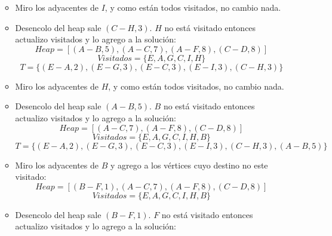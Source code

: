 \documentclass{article}
\begin{document}
\begin{enumerate}[label=\alph*)]
\begin{itemize}
\begin{equation*}
                \end{equation*}
            \item Miro los adyacentes de $I$, y como están todos visitados, no cambio nada.
            \item Desencolo del heap sale $(C-H, 3)$. $H$ no está visitado entonces actualizo visitados y lo agrego a la solución:
                \begin{equation*}
                    Heap = [(A-B, 5), (A-C, 7), (A-F, 8), (C-D, 8)]
                \end{equation*}
                \begin{equation*}
                    Visitados = \{E, A, G, C, I, H\}
                \end{equation*}
                \begin{equation*}
                    T = \{(E-A, 2), (E-G, 3), (E-C, 3), (E-I, 3), (C-H, 3)\}
                \end{equation*}
            \item Miro los adyacentes de $H$, y como están todos visitados, no cambio nada.
            \item Desencolo del heap sale $(A-B, 5)$. $B$ no está visitado entonces actualizo visitados y lo agrego a la solución:
                \begin{equation*}
                    Heap = [(A-C, 7), (A-F, 8), (C-D, 8)]
                \end{equation*}
                \begin{equation*}
                    Visitados = \{E, A, G, C, I, H, B\}
                \end{equation*}
                \begin{equation*}
                    T = \{(E-A, 2), (E-G, 3), (E-C, 3), (E-I, 3), (C-H, 3), (A-B, 5)\}
                \end{equation*}
            \item Miro los adyacentes de $B$ y agrego a los vértices cuyo destino no este visitado:
                \begin{equation*}
                    Heap = [(B-F, 1), (A-C, 7), (A-F, 8), (C-D, 8)]
                \end{equation*}
                \begin{equation*}
                    Visitados = \{E, A, G, C, I, H, B\}
                \end{equation*}
            \item Desencolo del heap sale $(B-F, 1)$. $F$ no está visitado entonces actualizo visitados y lo agrego a la solución:

\end{itemize}
\end{enumerate}
\end{document}
